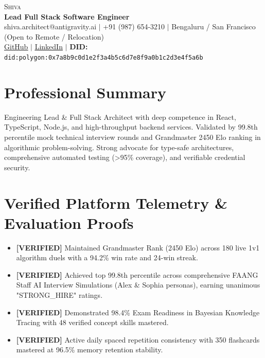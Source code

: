 \documentclass[letterpaper,10pt]{article}
\begin{document}
\begin{center}
    {\Huge \scshape Shiva} \\ \vspace{2pt}
    {\large \textbf{Lead Full Stack Software Engineer}} \\ \vspace{2pt}
    \small shiva.architect@antigravity.ai $|$ +91 (987) 654-3210 $|$ Bengaluru / San Francisco (Open to Remote / Relocation) \\
    \href{https://github.com/Pritamchaurasiya/Learning\_Hub}{\underline{GitHub}} $|$
    \href{https://linkedin.com/in/shiva-ai-architect}{\underline{LinkedIn}} $|$
    \textbf{DID:} \texttt{did:polygon:0x7a8b9c0d1e2f3a4b5c6d7e8f9a0b1c2d3e4f5a6b}
\end{center}

\section{Professional Summary}
\small{Engineering Lead \& Full Stack Architect with deep competence in React, TypeScript, Node.js, and high-throughput backend services. Validated by 99.8th percentile mock technical interview rounds and Grandmaster 2450 Elo ranking in algorithmic problem-solving. Strong advocate for type-safe architectures, comprehensive automated testing (>95\% coverage), and verifiable credential security.}

\section{Verified Platform Telemetry \& Evaluation Proofs}
\begin{itemize}[leftmargin=0.15in, label={\tiny$\blacksquare$}]
  \item \small{\textbf{[VERIFIED]} Maintained Grandmaster Rank (2450 Elo) across 180 live 1v1 algorithm duels with a 94.2\% win rate and 24-win streak.}
  \item \small{\textbf{[VERIFIED]} Achieved top 99.8th percentile across comprehensive FAANG Staff AI Interview Simulations (Alex \& Sophia personas), earning unanimous "STRONG\_HIRE" ratings.}
  \item \small{\textbf{[VERIFIED]} Demonstrated 98.4\% Exam Readiness in Bayesian Knowledge Tracing with 48 verified concept skills mastered.}
  \item \small{\textbf{[VERIFIED]} Active daily spaced repetition consistency with 350 flashcards mastered at 96.5\% memory retention stability.}
\end{itemize}
\end{document}
